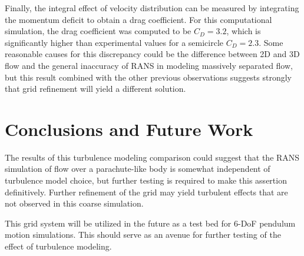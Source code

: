 \documentclass[]{aiaa-tc}%
\begin{document}
Finally, the integral effect of velocity distribution can be measured by integrating the momentum deficit to obtain a drag coefficient.  For this computational simulation, the drag coefficient was computed to be $C_D=3.2$, which is significantly higher than experimental values for a semicircle $C_D=2.3$.  Some reasonable causes for this discrepancy could be the difference between 2D and 3D flow and the general inaccuracy of RANS in modeling massively separated flow, but this result combined with the other previous observations suggests strongly that grid refinement will yield a different solution.

\section{Conclusions and Future Work}

The results of this turbulence modeling comparison could suggest that the RANS simulation of flow over a parachute-like body is somewhat independent of turbulence model choice, but further testing is required to make this assertion definitively.  Further refinement of the grid may yield turbulent effects that are not observed in this coarse simulation.

This grid system will be utilized in the future as a test bed for 6-DoF pendulum motion simulations.  This should serve as an avenue for further testing of the effect of turbulence modeling.
\end{document}
